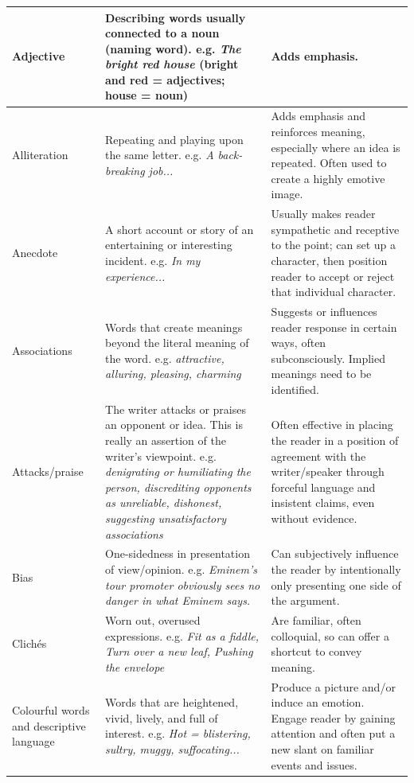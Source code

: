 \documentclass[a4paper]{article}
\begin{document}
\begin{longtable}{|p{2cm}|p{3.25cm}|p{3.25cm}|}
Adjective & Describing words usually connected to a noun (naming word). \newline e.g. \textit{The bright red house} (bright and red = adjectives; house = noun) & Adds emphasis. \\
\hline
Alliteration & Repeating and playing upon the same letter. \newline e.g. \textit{A back-breaking job...} & Adds emphasis and reinforces meaning, especially where an idea is repeated. Often used to create a highly emotive image. \\
\hline
Anecdote & A short account or story of an entertaining or interesting incident. \newline e.g. \textit{In my experience...} & Usually makes reader sympathetic and receptive to the point; can set up a character, then position reader to accept or reject that individual character. \\
\hline
Associations & Words that create meanings beyond the literal meaning of the word. \newline e.g. \textit{attractive, alluring, pleasing, charming} & Suggests or influences reader response in certain ways, often subconsciously. Implied meanings need to be identified. \\
\hline
Attacks/praise & The writer attacks or praises an opponent or idea. This is really an assertion of the writer's viewpoint. \newline e.g. \textit{denigrating or humiliating the person, discrediting opponents as unreliable, dishonest, suggesting unsatisfactory associations} & Often effective in placing the reader in a position of agreement with the writer/speaker through forceful language and insistent claims, even without evidence. \\
\hline
Bias & One-sidedness in presentation of view/opinion. \newline e.g. \textit{Eminem’s tour promoter obviously sees no danger in what Eminem says.} & Can subjectively influence the reader by intentionally only presenting one side of the argument. \\
\hline
Clichés & Worn out, overused expressions. \newline e.g. \textit{Fit as a fiddle, Turn over a new leaf, Pushing the envelope} & Are familiar, often colloquial, so can offer a shortcut to convey meaning. \\
\hline
Colourful words and descriptive language & Words that are heightened, vivid, lively, and full of interest. \newline e.g. \textit{Hot = blistering, sultry, muggy, suffocating...} & Produce a picture and/or induce an emotion. Engage reader by gaining attention and often put a new slant on familiar events and issues. \\

\end{longtable}
\end{document}
